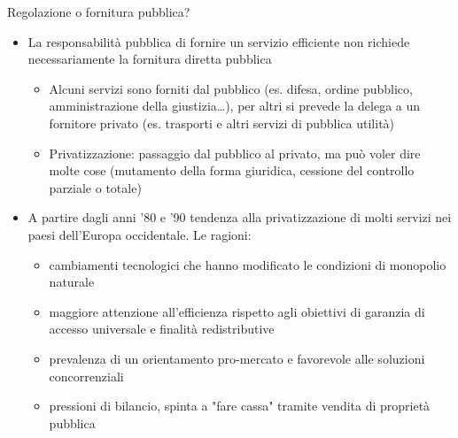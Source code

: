 \documentclass[aspectratio=149,11pt]{beamer}
\begin{document}
\begin{frame}{Regolazione o fornitura pubblica?}
\begin{itemize}
\item La responsabilità pubblica di fornire un servizio efficiente non richiede
necessariamente la fornitura diretta pubblica
\begin{itemize}
\item Alcuni servizi sono forniti dal pubblico (es. difesa, ordine pubblico,
amministrazione della giustizia\ldots{}), per altri si prevede la delega a un
fornitore privato (es. trasporti e altri servizi di pubblica utilità)
\item \alert{Privatizzazione}: passaggio dal pubblico al privato, ma può voler dire
molte cose (mutamento della forma giuridica, cessione del controllo
parziale o totale)
\end{itemize}
\item A partire dagli anni '80 e '90 tendenza alla privatizzazione di molti
servizi nei paesi dell'Europa occidentale. Le ragioni:
\begin{itemize}
\item cambiamenti tecnologici che hanno modificato le condizioni di monopolio
naturale
\item maggiore attenzione all'efficienza rispetto agli obiettivi di garanzia di
accesso universale e finalità redistributive
\item prevalenza di un orientamento pro-mercato e favorevole alle soluzioni
concorrenziali
\item pressioni di bilancio, spinta a "fare cassa" tramite vendita di proprietà
pubblica
\end{itemize}
\end{itemize}
\end{frame}
\end{document}
